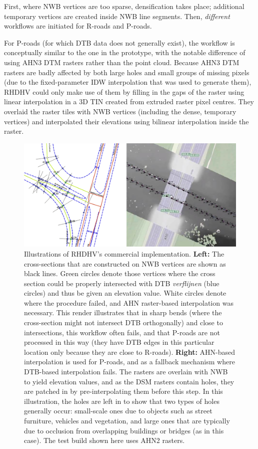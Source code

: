 First, where NWB vertices are too sparse, densification takes place; additional temporary vertices are created inside NWB line segments. Then, \textit{different} workflows are initiated for R-roads and P-roads.

For P-roads (for which DTB data does not generally exist), the workflow is conceptually similar to the one in the prototype, with the notable difference of using AHN3 DTM rasters rather than the point cloud. Because AHN3 DTM rasters are badly affected by both large holes and small groups of missing pixels (due to the fixed-parameter IDW interpolation that was used to generate them), RHDHV could only make use of them by filling in the gaps of the raster using linear interpolation in a 3D TIN created from extruded raster pixel centres. They overlaid the raster tiles with NWB vertices (including the dense, temporary vertices) and interpolated their elevations using bilinear interpolation inside the raster.

\begin{figure}[h]
    \centering
    \includegraphics[width=\linewidth]{p2/figs/rhdhv_combined.png}
    \caption{Illustrations of RHDHV's commercial implementation. \textbf{Left:} The cross-sections that are constructed on NWB vertices are shown as black lines. Green circles denote those vertices where the cross section could be properly intersected with DTB \textit{verflijnen} (blue circles) and thus be given an elevation value. White circles denote where the procedure failed, and AHN raster-based interpolation was necessary. This render illustrates that in sharp bends (where the cross-section might not intersect DTB orthogonally) and close to intersections, this workflow often fails, and that P-roads are not processed in this way (they have DTB edges in this particular location only because they are close to R-roads). \textbf{Right:} AHN-based interpolation is used for P-roads, and as a fallback mechanism where DTB-based interpolation fails. The rasters are overlain with NWB to yield elevation values, and as the DSM rasters contain holes, they are patched in by pre-interpolating them before this step. In this illustration, the holes are left in to show that two types of holes generally occur: small-scale ones due to objects such as street furniture, vehicles and vegetation, and large ones that are typically due to occlusion from overlapping buildings or bridges (as in this case). The test build shown here uses AHN2 rasters.}
    \label{fig:rhdhv}
\end{figure}

